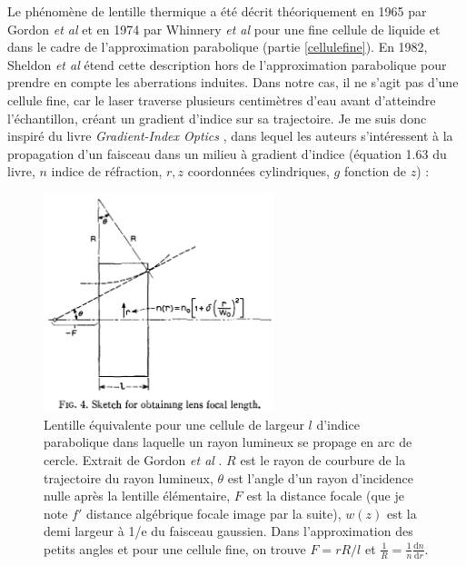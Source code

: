 Le phénomène de lentille thermique a été décrit théoriquement en 1965 par Gordon \emph{et al} \cite{gordon_longtransient_1965} et en 1974 par Whinnery \emph{et al} \cite{whinnery_laser_1974} pour une fine cellule de liquide et dans le cadre de l'approximation parabolique (partie \ref{cellulefine}). En 1982, Sheldon \emph{et al} \cite{sheldon_laser-induced_1982} étend cette description hors de l'approximation parabolique pour prendre en compte les aberrations induites. Dans notre cas, il ne s'agit pas d'une cellule fine, car le laser traverse plusieurs centimètres d'eau avant d'atteindre l'échantillon, créant un gradient d'indice sur sa trajectoire. Je me suis donc inspiré du livre \emph{Gradient-Index Optics} \cite{gomez-reino_gradient-index_2002}, dans lequel les auteurs s'intéressent à la propagation d'un faisceau dans un milieu à gradient d'indice (équation 1.63 du livre, $n$ indice de réfraction, $r,z$ coordonnées cylindriques, $g$ fonction de $z$) :

\begin{figure}
    \centering
    \includegraphics[width=0.6\textwidth]{./files/gordon_lens.png}
    \caption{Lentille équivalente pour une cellule de largeur $l$ d'indice parabolique dans laquelle un rayon lumineux se propage en arc de cercle. Extrait de Gordon \emph{et al} \cite{gordon_longtransient_1965}. $R$ est le rayon de courbure de la trajectoire du rayon lumineux, $\theta$ est l'angle d'un rayon d'incidence nulle après la lentille élémentaire, $F$ est la distance focale (que je note $f'$ distance algébrique focale image par la suite), $w(z)$ est la demi largeur à 1/e du faisceau gaussien. Dans l'approximation des petits angles et pour une cellule fine, on trouve $F = rR/l$ et $\frac{1}{R} = \frac{1}{n}\frac{\mathrm{d}n}{\mathrm{d}r}$.
    \label{FIGgordonlens}}
    \end{figure}

